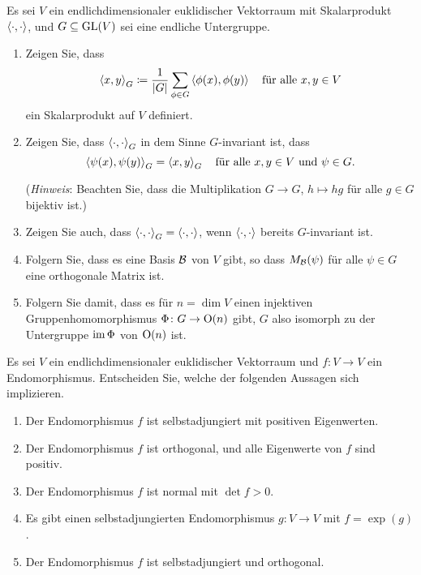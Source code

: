 \begin{question}[subtitle = Invariante Skalarprodukte]{3}
  Es sei $V$ ein endlichdimensionaler euklidischer Vektorraum mit Skalarprodukt $\left\langle \cdot, \cdot \right\rangle$, und $G \subseteq \operatorname{GL}(V)$ sei eine endliche Untergruppe.
  \begin{enumerate}[leftmargin=*]
    \item
      Zeigen Sie, dass
      \[
        \left\langle x,y \right\rangle_G \coloneqq \frac{1}{|G|} \sum_{\phi \in G} \left\langle \phi(x), \phi(y) \right\rangle
        \quad
        \text{für alle $x, y \in V$}
      \]
      ein Skalarprodukt auf $V$ definiert.
    \item
      Zeigen Sie, dass $\left\langle \cdot, \cdot \right\rangle_G$ in dem Sinne $G$-invariant ist, dass
      \[
        \left\langle \psi(x), \psi(y) \right\rangle_G = \left\langle x,y \right\rangle_G
        \quad
        \text{für alle $x, y \in V$ und $\psi \in G$}.
      \]
      
      (\emph{Hinweis}:
       Beachten Sie, dass die Multiplikation $G \to G$, $h \mapsto hg$ für alle $g \in G$ bijektiv ist.)
    \item
      Zeigen Sie auch, dass $\left\langle \cdot, \cdot \right\rangle_G = \left\langle \cdot, \cdot \right\rangle$, wenn $\left\langle \cdot, \cdot \right\rangle$ bereits $G$-invariant ist.
    \item
      Folgern Sie, dass es eine Basis $\mathcal{B}$ von $V$ gibt, so dass $M_{\mathcal{B}}(\psi)$ für alle $\psi \in G$ eine orthogonale Matrix ist.
    \item
      Folgern Sie damit, dass es für $n = \dim V$ einen injektiven Gruppenhomomorphismus $\Phi \colon G \to \operatorname{O}(n)$ gibt, $G$ also isomorph zu der Untergruppe $\operatorname{im} \Phi$ von $\operatorname{O}(n)$ ist.
  \end{enumerate}
\end{question}


\begin{question}[subtitle = Implikationen zwischen verschiedene Aussagen]{3}
  Es sei $V$ ein endlichdimensionaler euklidischer Vektorraum und $f \colon V \to V$ ein Endomorphismus.
  Entscheiden Sie, welche der folgenden Aussagen sich implizieren.
  \begin{enumerate}
    \item
      Der Endomorphismus $f$ ist selbstadjungiert mit positiven Eigenwerten.
    \item
      Der Endomorphismus $f$ ist orthogonal, und alle Eigenwerte von $f$ sind positiv.
    \item
      Der Endomorphismus $f$ ist normal mit $\det f > 0$.
    \item
      Es gibt einen selbstadjungierten Endomorphismus $g \colon V \to V$ mit $f = \exp(g)$.
    \item
      Der Endomorphismus $f$ ist selbstadjungiert und orthogonal.
  \end{enumerate}
\end{question}


